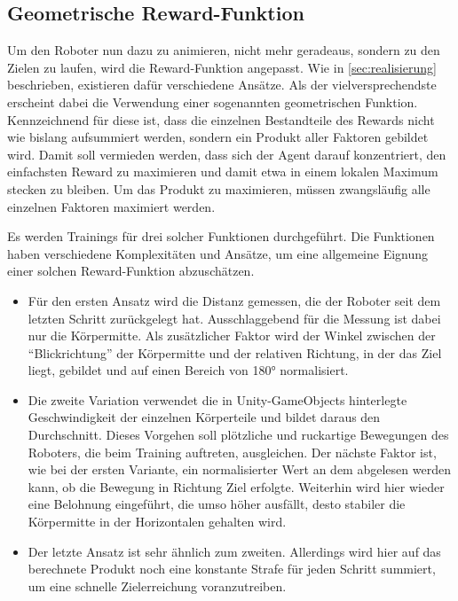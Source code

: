 \begin{figure}
    
\end{figure}

\subsection{Geometrische Reward-Funktion}
Um den Roboter nun dazu zu animieren, nicht mehr geradeaus, sondern zu den Zielen zu laufen, wird die Reward-Funktion angepasst.
Wie in \autoref{sec:realisierung} beschrieben, existieren dafür verschiedene Ansätze.
Als der vielversprechendste erscheint dabei die Verwendung einer sogenannten geometrischen Funktion.
Kennzeichnend für diese ist, dass die einzelnen Bestandteile des Rewards nicht wie bislang aufsummiert werden, sondern ein Produkt aller Faktoren gebildet wird.
Damit soll vermieden werden, dass sich der Agent darauf konzentriert, den einfachsten Reward zu maximieren und damit etwa in einem lokalen Maximum stecken zu bleiben.
Um das Produkt zu maximieren, müssen zwangsläufig alle einzelnen Faktoren maximiert werden.

Es werden Trainings für drei solcher Funktionen durchgeführt.
Die Funktionen haben verschiedene Komplexitäten und Ansätze, um eine allgemeine Eignung einer solchen Reward-Funktion abzuschätzen.
\begin{itemize}
    \item Für den ersten Ansatz wird die Distanz gemessen, die der Roboter seit dem letzten Schritt zurückgelegt hat.
    Ausschlaggebend für die Messung ist dabei nur die Körpermitte.
    Als zusätzlicher Faktor wird der Winkel zwischen der \enquote{Blickrichtung} der Körpermitte und der relativen Richtung, in der das Ziel liegt, gebildet und auf einen Bereich von 180° normalisiert.

    \item Die zweite Variation verwendet die in Unity-GameObjects hinterlegte Geschwindigkeit der einzelnen Körperteile und bildet daraus den Durchschnitt.
    Dieses Vorgehen soll plötzliche und ruckartige Bewegungen des Roboters, die beim Training auftreten, ausgleichen.
    Der nächste Faktor ist, wie bei der ersten Variante, ein normalisierter Wert an dem abgelesen werden kann, ob die Bewegung in Richtung Ziel erfolgte.
    Weiterhin wird hier wieder eine Belohnung eingeführt, die umso höher ausfällt, desto stabiler die Körpermitte in der Horizontalen gehalten wird.

    \item Der letzte Ansatz ist sehr ähnlich zum zweiten.
    Allerdings wird hier auf das berechnete Produkt noch eine konstante Strafe für jeden Schritt summiert, um eine schnelle Zielerreichung voranzutreiben.
\end{itemize}

